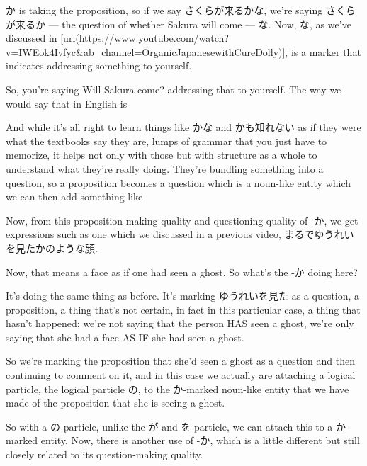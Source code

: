 か is taking the proposition, so if we say さくらが来るかな, we're saying さくらが来るか --- the question of whether Sakura will come --- な. Now, な, as we've discussed in [url(https://www.youtube.com/watch?v=IWEok4Ivfyc&ab_channel=OrganicJapanesewithCureDolly)], is a marker that indicates addressing something to yourself.

So, you're saying Will Sakura come? addressing that to yourself. The way we would say that in English is 

And while it's all right to learn things like かな and かも知れない as if they were what the textbooks say they are, lumps of grammar that you just have to memorize, it helps not only with those but with structure as a whole to understand what they're really doing. They're bundling something into a question, so a proposition becomes a question which is a noun-like entity which we can then add something like 

Now, from this proposition-making quality and questioning quality of -か, we get expressions such as one which we discussed in a previous video, まるでゆうれいを見たかのような顔.

{}

Now, that means a face as if one had seen a ghost. So what's the -か doing here?

It's doing the same thing as before. It's marking ゆうれいを見た as a question, a proposition, a thing that's not certain, in fact in this particular case, a thing that hasn't happened: we're not saying that the person HAS seen a ghost, we're only saying that she had a face AS IF she had seen a ghost.

So we're marking the proposition that she'd seen a ghost as a question and then continuing to comment on it, and in this case we actually are attaching a logical particle, the logical particle の, to the か-marked noun-like entity that we have made of the proposition that she is seeing a ghost.

{}

So with a の-particle, unlike the が and を-particle, we can attach this to a か-marked entity. Now, there is another use of -か, which is a little different but still closely related to its question-making quality.

